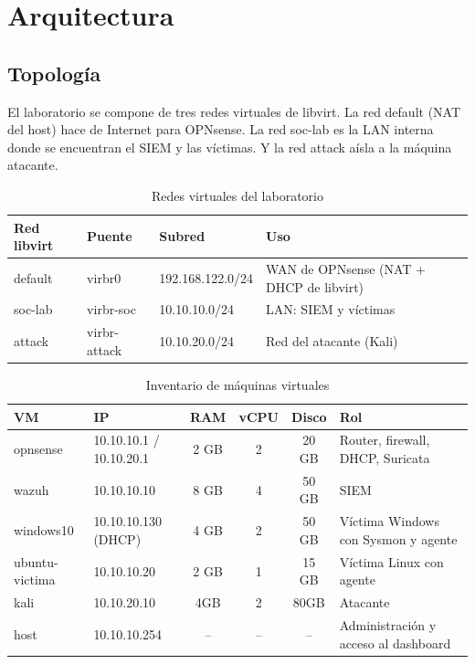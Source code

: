 \chapter{Arquitectura}\label{cap:arquitectura}

\section{Topología}
El laboratorio se compone de tres redes virtuales de libvirt. La red
default (NAT del host) hace de Internet para OPNsense. La red
soc-lab es la LAN interna donde se encuentran el SIEM y las víctimas. Y la red attack aísla a la máquina atacante.


\begin{table}[H]\centering\small
\begin{tabularx}{\linewidth}{l l l X}
  \toprule
  \textbf{Red libvirt} & \textbf{Puente} & \textbf{Subred} & \textbf{Uso} \\
  \midrule
  default & virbr0       & 192.168.122.0/24 & WAN de OPNsense (NAT + DHCP de libvirt) \\
  soc-lab & virbr-soc    & 10.10.10.0/24    & LAN: SIEM y víctimas \\
  attack  & virbr-attack & 10.10.20.0/24    & Red del atacante (Kali) \\
  \bottomrule
\end{tabularx}
\caption{Redes virtuales del laboratorio}\label{tab:redes}
\end{table}

\begin{table}[H]\centering\small
\begin{tabularx}{\linewidth}{l l c c c X}
  \toprule
  \textbf{VM} & \textbf{IP} & \textbf{RAM} & \textbf{vCPU} & \textbf{Disco} & \textbf{Rol} \\
  \midrule
  opnsense       & 10.10.10.1 / 10.10.20.1 & 2 GB & 2 & 20 GB & Router, firewall, DHCP, Suricata \\
  wazuh          & 10.10.10.10             & 8 GB & 4 & 50 GB & SIEM \\
  windows10      & 10.10.10.130 (DHCP)     & 4 GB & 2 & 50 GB & Víctima Windows con Sysmon y agente \\
  ubuntu-victima & 10.10.10.20             & 2 GB & 1 & 15 GB & Víctima Linux con agente \\
  kali           & 10.10.20.10             & 4GB   & 2 & 80GB   & Atacante \\
  host           & 10.10.10.254            & --   & -- & --   & Administración y acceso al dashboard \\
  \bottomrule
\end{tabularx}
\caption{Inventario de máquinas virtuales}\label{tab:inventario}
\end{table}

